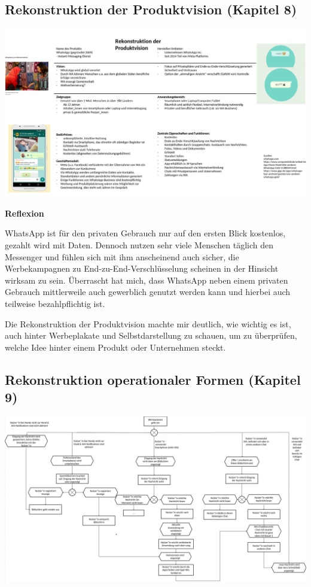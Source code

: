 \documentclass[
  a4paper,
]{book}
\begin{document}
\subsection*{Rekonstruktion der Produktvision (Kapitel 8)}\label{rekonstruktion-der-produktvision-kapitel-8-1}

\begin{center}\includegraphics{Figures/08-Bsp.2} \end{center}

\textbf{Reflexion}

WhatsApp ist für den privaten Gebrauch nur auf den ersten Blick kostenlos, gezahlt wird mit Daten. Dennoch nutzen sehr viele Menschen täglich den Messenger und fühlen sich mit ihm anscheinend auch sicher, die Werbekampagnen zu End-zu-End-Verschlüsselung scheinen in der Hinsicht wirksam zu sein. Überrascht hat mich, dass WhatsApp neben einem privaten Gebrauch mittlerweile auch gewerblich genutzt werden kann und hierbei auch teilweise bezahlpflichtig ist.

Die Rekonstruktion der Produktvision machte mir deutlich, wie wichtig es ist, auch hinter Werbeplakate und Selbstdarstellung zu schauen, um zu überprüfen, welche Idee hinter einem Produkt oder Unternehmen steckt.

\subsection*{Rekonstruktion operationaler Formen (Kapitel 9)}\label{rekonstruktion-operationaler-formen-kapitel-9-1}

\begin{center}\includegraphics{Figures/09-Bsp.2} \end{center}
\end{document}
